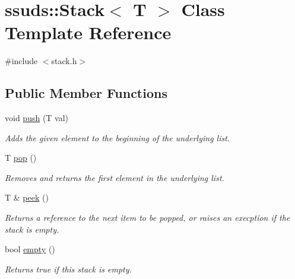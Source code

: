 \hypertarget{classssuds_1_1_stack}{}\section{ssuds\+::Stack$<$ T $>$ Class Template Reference}
\label{classssuds_1_1_stack}


{\ttfamily \#include $<$stack.\+h$>$}

\subsection*{Public Member Functions}
\begin{DoxyCompactItemize}
\item 
\mbox{\label{classssuds_1_1_stack_af4c17b8bbc88dfa4bed73d902a52068f}} 
void \mbox{\hyperlink{classssuds_1_1_stack_af4c17b8bbc88dfa4bed73d902a52068f}{push}} (T val)
\begin{DoxyCompactList}\small\item\em Adds the given element to the beginning of the underlying list. \end{DoxyCompactList}\item 
\mbox{\label{classssuds_1_1_stack_a616d94b99a468e3c06b725f86c202e47}} 
T \mbox{\hyperlink{classssuds_1_1_stack_a616d94b99a468e3c06b725f86c202e47}{pop}} ()
\begin{DoxyCompactList}\small\item\em Removes and returns the first element in the underlying list. \end{DoxyCompactList}\item 
\mbox{\label{classssuds_1_1_stack_a2e088afa10d964bb76121660100d5d0a}} 
T \& \mbox{\hyperlink{classssuds_1_1_stack_a2e088afa10d964bb76121660100d5d0a}{peek}} ()
\begin{DoxyCompactList}\small\item\em Returns a reference to the next item to be popped, or raises an execption if the stack is empty. \end{DoxyCompactList}\item 
\mbox{\label{classssuds_1_1_stack_ac77ccba39cac8685c780806ae8e86b3f}} 
bool \mbox{\hyperlink{classssuds_1_1_stack_ac77ccba39cac8685c780806ae8e86b3f}{empty}} ()
\begin{DoxyCompactList}\small\item\em Returns true if this stack is empty. \end{DoxyCompactList}\end{DoxyCompactItemize}
